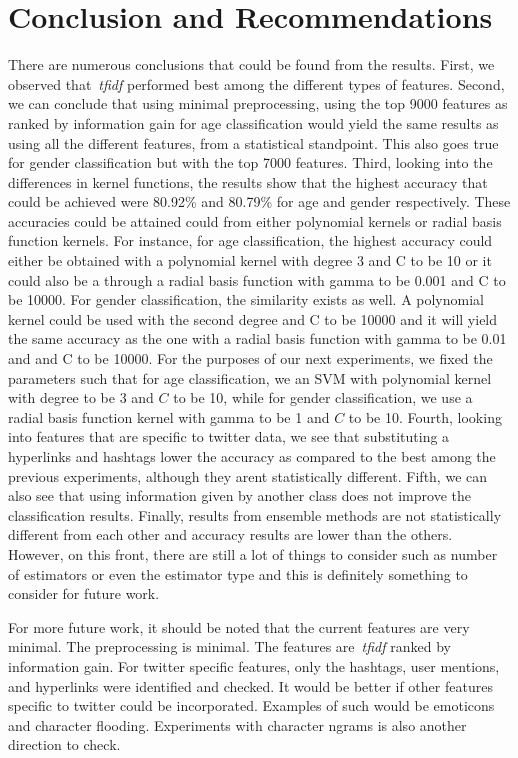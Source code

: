\documentclass[a4paper]{llncs}
\begin{document}
\section{Conclusion and Recommendations}
There are numerous conclusions that could be found from the results. First, we observed that~\textit{tfidf} performed best among the different types of features. Second, we can conclude that using minimal preprocessing, using the top 9000 features as ranked by information gain for age classification would yield the same results as using all the different features, from a statistical standpoint. This also goes true for gender classification but with the top 7000 features. Third, looking into the differences in kernel functions, the results show that the highest accuracy that could be achieved were 80.92\% and 80.79\% for age and gender respectively. These accuracies could be attained could from either polynomial kernels or radial basis function kernels. For instance, for age classification, the highest accuracy could either be obtained with a polynomial kernel with degree 3 and C to be 10 or it could also be a through a radial basis function with gamma to be 0.001 and C to be 10000. For gender classification, the similarity exists as well. A polynomial kernel could be used with the second degree and C to be 10000 and it will yield the same accuracy as the one with a radial basis function with gamma to be 0.01 and and C to be 10000. For the purposes of our next experiments, we fixed the parameters such that for age classification, we an SVM with polynomial kernel with degree to be 3 and $C$ to be 10, while for gender classification, we use a radial basis function kernel with gamma to be 1 and $C$ to be 10. Fourth, looking into features that are specific to twitter data, we see that substituting a hyperlinks and hashtags lower the accuracy as compared to the best among the previous experiments, although they arent statistically different. Fifth, we can also see that using information given by another class does not improve the classification results. Finally, results from ensemble methods are not statistically different from each other and accuracy results are lower than the others. However, on this front, there are still a lot of things to consider such as number of estimators or even the estimator type and this is definitely something to consider for future work.  

For more future work, it should be noted that the current features are very minimal. The preprocessing is minimal. The features are~\textit{tfidf} ranked by information gain. For twitter specific features, only the hashtags, user mentions, and hyperlinks were identified and checked. It would be better if other features specific to twitter could be incorporated. Examples of such would be emoticons and character flooding. Experiments with character ngrams is also another direction to check. 




\end{document}
